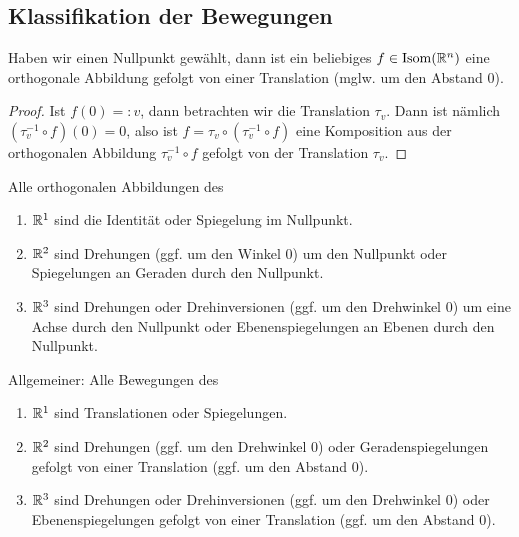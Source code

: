 \subsection{Klassifikation der Bewegungen}

\begin{lemma}
Haben wir einen Nullpunkt gewählt, dann ist ein beliebiges $f\in\operatorname{Isom}(\mathbb{R}^n)$ eine orthogonale Abbildung gefolgt von einer Translation (mglw. um den Abstand $0$).
\end{lemma}
\begin{proof}
Ist $f(0)=:v$, dann betrachten wir die Translation $\tau_v$. Dann ist nämlich $(\tau_v^{-1}\circ f)(0) = 0$, also ist $f=\tau_v\circ(\tau_v^{-1}\circ f)$ eine Komposition aus der orthogonalen Abbildung $\tau_v^{-1}\circ f$ gefolgt von der Translation $\tau_v$.
\end{proof}

\begin{theorem}
Alle orthogonalen Abbildungen des
\begin{enumerate}
\item $\mathbb{R}^1$ sind die Identität oder Spiegelung im Nullpunkt.
\item $\mathbb{R}^2$ sind Drehungen (ggf. um den Winkel $0$) um den Nullpunkt oder Spiegelungen an Geraden durch den Nullpunkt.
\item $\mathbb{R}^3$ sind Drehungen oder Drehinversionen (ggf. um den Drehwinkel $0$) um eine Achse durch den Nullpunkt oder Ebenenspiegelungen an Ebenen durch den Nullpunkt.
\end{enumerate}

Allgemeiner: Alle Bewegungen des
\begin{enumerate}
\item $\mathbb{R}^1$ sind Translationen oder Spiegelungen.
\item $\mathbb{R}^2$ sind Drehungen (ggf. um den Drehwinkel $0$) oder Geradenspiegelungen gefolgt von einer Translation (ggf. um den Abstand $0$).
\item $\mathbb{R}^3$ sind Drehungen oder Drehinversionen (ggf. um den Drehwinkel $0$) oder Ebenenspiegelungen gefolgt von einer Translation (ggf. um den Abstand $0$).
\end{enumerate}
\end{theorem}

